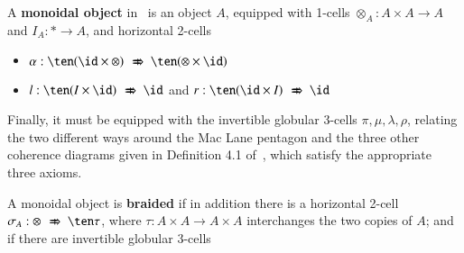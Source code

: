 \begin{defn}
A {\bf monoidal object} in \fB\ is an object $A$, equipped with 1-cells $\otimes_A: A \times A \rightarrow A$ and $I_A: * \rightarrow A$, and horizontal 2-cells
\begin{itemize} 
\item $\alpha: \ten  (\id \times \tens) \xslashedRightarrow{} \ten (\tens \times \id)$
\item $l: \ten (I \times \id) \xslashedRightarrow{} \id$ and $r:\ten (\id \times I) \xslashedRightarrow{} \id$ 
\end{itemize}
Finally, it must be equipped with the invertible globular 3-cells $\pi, \mu, \lambda, \rho$, relating the two different ways around the Mac Lane pentagon and the three other coherence diagrams given in Definition 4.1 of~\cite{nick:tricatsbook}, which satisfy the appropriate three axioms.

A monoidal object is {\bf braided} if in addition there is a horizontal 2-cell $\sigma_A: \tens \xslashedRightarrow{} \ten \tau$, where $\tau: A \times A \rightarrow A \times A$ interchanges the two copies of $A$; and if there are invertible globular 3-cells 


\end{defn}
